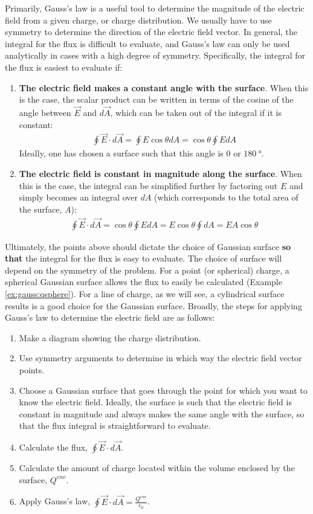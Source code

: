 Primarily, Gauss's law is a useful tool to determine the magnitude of the electric field from a given charge, or charge distribution. We usually have to use symmetry to determine the direction of the electric field vector. In general, the integral for the flux is difficult to evaluate, and Gauss's law can only be used analytically in cases with a high degree of symmetry. Specifically, the integral for the flux is easiest to evaluate if:
\begin{enumerate}
\item \textbf{The electric field makes a constant angle with the surface}. When this is the case, the scalar product can be written in terms of the cosine of the angle between $\vec E$ and $d\vec A$, which can be taken out of the integral if it is constant:
\begin{align*}
\oint \vec E\cdot d\vec A=\oint E\cos\theta dA=\cos\theta\oint EdA
\end{align*}
Ideally, one has chosen a surface such that this angle is $0$ or $\SI{180}{\degree}$.
\item \textbf{The electric field is constant in magnitude along the surface}. When this is the case, the integral can be simplified further by factoring out $E$ and simply becomes an integral over $dA$ (which corresponds to the total area of the surface, $A$):
\begin{align*}
\oint \vec E\cdot d\vec A=\cos\theta\oint EdA =E\cos\theta\oint dA=EA\cos\theta 
\end{align*}
\end{enumerate}
Ultimately, the points above should dictate the choice of Gaussian surface \textbf{so that} the integral for the flux is easy to evaluate. The choice of surface will depend on the symmetry of the problem. For a point (or spherical) charge, a spherical Gaussian surface allows the flux to easily be calculated (Example \ref{ex:gauss:qsphere}). For a line of charge, as we will see, a cylindrical surface results is a good choice for the Gaussian surface. Broadly, the steps for applying Gauss's law to determine the electric field are as follows:
\begin{enumerate}
\item Make a diagram showing the charge distribution.
\item Use symmetry arguments to determine in which way the electric field vector points.
\item Choose a Gaussian surface that goes through the point for which you want to know the electric field. Ideally, the surface is such that the electric field is constant in magnitude and always makes the same angle with the surface, so that the flux integral is straightforward to evaluate.
\item Calculate the flux, $\oint \vec E\cdot d\vec A$.
\item Calculate the amount of charge located within the volume enclosed by the surface, $Q^{enc}$.
\item Apply Gauss's law,  $\oint \vec E\cdot d\vec A=\frac{Q^{enc}}{\epsilon_0} $.
\end{enumerate}
